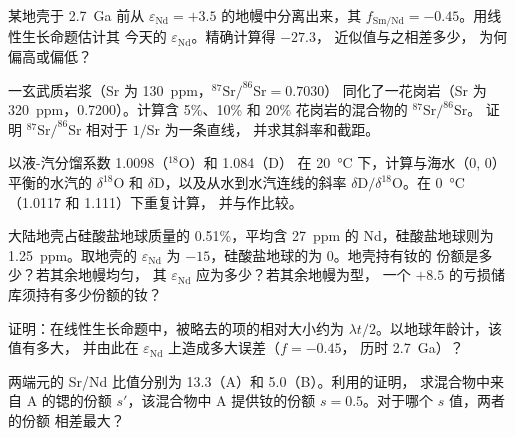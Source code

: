 \begin{exercise}[$\star\star$]\label{exo:b2:isotope-geochemistry:6}
某地壳于 \qty{2.7}{Ga} 前从
$\varepsilon_{\mathrm{Nd}} = +3.5$ 的地幔中分离出来，其 $f_{\mathrm{Sm/Nd}} = -0.45$。用线性生长命题估计其
今天的 $\varepsilon_{\mathrm{Nd}}$。精确计算得 $-27.3$，
近似值与之相差多少，
为何偏高或偏低？
\end{exercise}

\begin{exercise}[$\star\star$]\label{exo:b2:isotope-geochemistry:7}
一玄武质岩浆（Sr 为 \qty{130}{ppm}，$^{87}\mathrm{Sr}/^{86}\mathrm{Sr} = 0.7030$）
同化了一花岗岩（Sr 为 \qty{320}{ppm}，0.7200）。计算含
5\%、10\% 和 20\% 花岗岩的混合物的 $^{87}\mathrm{Sr}/^{86}\mathrm{Sr}$。
证明 $^{87}\mathrm{Sr}/^{86}\mathrm{Sr}$ 相对于 $1/\mathrm{Sr}$ 为一条直线，
并求其斜率和截距。
\end{exercise}

\begin{exercise}[$\star\star$]\label{exo:b2:isotope-geochemistry:8}
以液-汽分馏系数 1.0098（$^{18}$O）和 1.084（D）
在 \qty{20}{\degreeCelsius} 下，计算与海水（0, 0）平衡的水汽的
$\delta^{18}\mathrm{O}$ 和 $\delta\mathrm{D}$，以及从水到水汽连线的斜率
$\delta\mathrm{D}/\delta^{18}\mathrm{O}$。在 \qty{0}{\degreeCelsius}（1.0117 和 1.111）下重复计算，
并与作比较。
\end{exercise}

\begin{exercise}[$\star\star$]\label{exo:b2:isotope-geochemistry:9}
大陆地壳占硅酸盐地球质量的 0.51\%，平均含
\qty{27}{ppm} 的 Nd，硅酸盐地球则为 \qty{1.25}{ppm}。取地壳的
$\varepsilon_{\mathrm{Nd}}$ 为 $-15$，硅酸盐地球的为 0。地壳持有钕的
份额是多少？若其余地幔均匀，
其 $\varepsilon_{\mathrm{Nd}}$ 应为多少？若其余地幔为型，
一个 $+8.5$ 的亏损储库须持有多少份额的钕？
\end{exercise}

\begin{exercise}[$\star\star\star$]\label{exo:b2:isotope-geochemistry:10}
证明：在线性生长命题中，被略去的项的相对大小约为
$\lambda t/2$。以地球年龄计，该值有多大，
并由此在 $\varepsilon_{\mathrm{Nd}}$ 上造成多大误差（$f = -0.45$，
历时 \qty{2.7}{Ga}）？
\end{exercise}

\begin{exercise}[$\star\star\star$]\label{exo:b2:isotope-geochemistry:11}
两端元的 Sr/Nd 比值分别为 13.3（A）和 5.0（B）。利用的证明，
求混合物中来自 A 的锶的份额 $s'$，该混合物中 A
提供钕的份额 $s = 0.5$。对于哪个 $s$ 值，两者的份额
相差最大？
\end{exercise}

